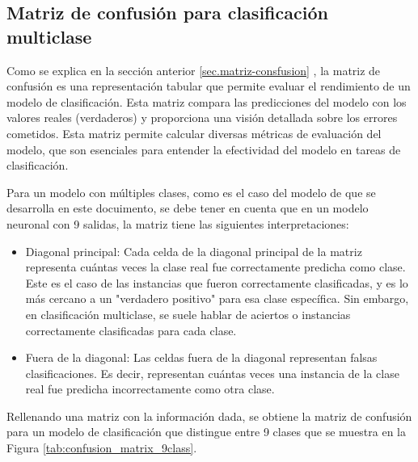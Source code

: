 \subsection{Matriz de confusión para clasificación multiclase} \label{sec.matriz-consfusion-multi}

Como se explica en la sección anterior \ref{sec.matriz-consfusion} , la matriz de confusión es una representación tabular que permite evaluar el rendimiento de un modelo de clasificación. Esta matriz compara las predicciones del modelo con los valores reales (verdaderos) y proporciona una visión detallada sobre los errores cometidos. Esta matriz permite calcular diversas métricas de evaluación del modelo, que son esenciales para entender la efectividad del modelo en tareas de clasificación.


Para un modelo con múltiples clases, como es el caso del modelo de que se desarrolla en este docuimento, se debe tener en cuenta que en un modelo neuronal con 9 salidas, la matriz tiene las siguientes interpretaciones:
\begin{itemize}
	\item Diagonal principal: Cada celda de la diagonal principal de la matriz representa cuántas veces la clase real fue correctamente predicha como clase. Este es el caso de las instancias que fueron correctamente clasificadas, y es lo más cercano a un "verdadero positivo" para esa clase específica. Sin embargo, en clasificación multiclase, se suele hablar de aciertos o instancias correctamente clasificadas para cada clase.
	\item Fuera de la diagonal: Las celdas fuera de la diagonal representan falsas clasificaciones. Es decir, representan cuántas veces una instancia de la clase real fue predicha incorrectamente como otra clase.

\end{itemize}
Rellenando una matriz con la información dada, se obtiene la matriz de confusión para un modelo de clasificación que distingue entre 9 clases que se muestra en la Figura \ref{tab:confusion_matrix_9class}.


